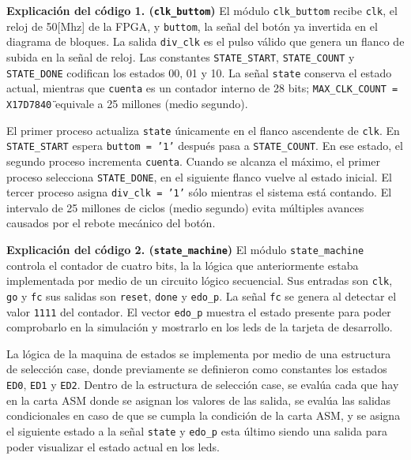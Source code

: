 \documentclass[letterpaper,12pt]{article}
\begin{document}
\textbf{Explicación del código 1. (\texttt{clk\_buttom})} El módulo \texttt{clk\_buttom} recibe \texttt{clk}, el reloj de 50[Mhz] de la FPGA, y \texttt{buttom}, la señal del botón ya invertida en el diagrama de bloques. La salida \texttt{div\_clk} es el pulso válido que genera un flanco de subida en la señal de reloj. Las constantes \texttt{STATE\_START}, \texttt{STATE\_COUNT} y \texttt{STATE\_DONE} codifican los estados 00, 01 y 10. La señal \texttt{state} conserva el estado actual, mientras que \texttt{cuenta} es un contador interno de 28 bits; \texttt{MAX\_CLK\_COUNT = X\"17D7840\"} equivale a 25 millones (medio segundo).

El primer proceso actualiza \texttt{state} únicamente en el flanco ascendente de \texttt{clk}. En \texttt{STATE\_START} espera \texttt{buttom = '1'} después pasa a \texttt{STATE\_COUNT}. En ese estado, el segundo proceso incrementa \texttt{cuenta}. Cuando se alcanza el máximo, el primer proceso selecciona \texttt{STATE\_DONE}, en el siguiente flanco vuelve al estado inicial. El tercer proceso asigna \texttt{div\_clk = '1'} sólo mientras el sistema está contando. El intervalo de 25 millones de ciclos (medio segundo) evita múltiples avances causados por el rebote mecánico del botón.



\textbf{Explicación del código 2. (\texttt{state\_machine})} El módulo \texttt{state\_machine} controla el contador de cuatro bits, la la lógica que anteriormente estaba implementada por medio de un circuito lógico secuencial. Sus entradas son \texttt{clk}, \texttt{go} y \texttt{fc} sus salidas son \texttt{reset}, \texttt{done} y \texttt{edo\_p}. La señal \texttt{fc} se genera al detectar el valor \texttt{1111} del contador. El vector \texttt{edo\_p} muestra el estado presente para poder comprobarlo en la simulación y mostrarlo en los leds de la tarjeta de desarrollo.

La lógica de la maquina de estados se implementa por medio de una estructura de selección case, donde previamente se definieron como constantes los estados \texttt{ED0}, \texttt{ED1} y \texttt{ED2}. Dentro de la estructura de selección case, se evalúa cada que hay en la carta ASM donde se asignan los valores de las salida, se evalúa las salidas condicionales en caso de que se cumpla la condición de la carta ASM, y se asigna el siguiente estado a la señal \texttt{state} y \texttt{edo\_p} esta último siendo una salida para poder visualizar el estado actual en los leds.
\end{document}
